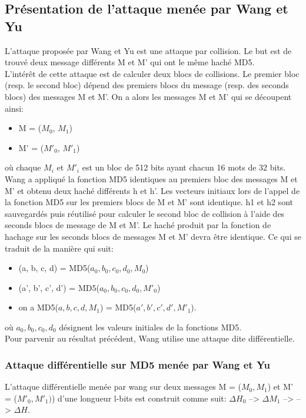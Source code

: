 \subsection{Présentation de l'attaque menée par Wang et Yu}
L'attaque proposée par Wang et Yu est une attaque par collision. Le but est de trouvé deux message différents M et M' qui ont le même haché MD5.\\

L'intérêt de cette attaque est de calculer deux blocs de collisions. Le premier bloc (resp. le second bloc) dépend des premiers blocs du message (resp. des seconds blocs) des messages M et M'. On a alors les messages M et M' qui se découpent ainsi:
\begin{itemize}
  \item M = ($M_{0}$, $M_{1}$)
  \item M' = ($M'_{0}$, $M'_{1}$)
\end{itemize}
où chaque $M_{i}$ et $M'_{i}$ est un bloc de 512 bits ayant chacun 16 mots de 32 bits.\\

Wang a appliqué la fonction MD5 identiques au premiers bloc des messages M et M' et obtenu deux haché différents h et h'. Les vecteurs initiaux lors de l'appel de la fonction MD5  sur les premiers blocs de M et M' sont identique. h1 et h2 sont sauvegardés puis réutilisé pour calculer le second bloc de collision à l'aide des seconds blocs de message de M et M'. Le haché produit par la fonction de hachage sur les seconds blocs de messages M et M' devra être identique. Ce qui se traduit de la manière qui suit:\\

\begin{itemize}
\item (a, b, c, d) = MD5($a_0, b_0, c_0, d_0, M_0$)
\item (a', b', c', d') = MD5($a_0, b_0, c_0, d_0, M'_0$)
\item on a MD5($a, b, c, d, M_1$) = MD5($a', b', c', d', M'_1$).
\end{itemize}

où $a_0, b_0, c_0, d_0$ désignent les valeurs initiales de la fonctions MD5.\\

Pour parvenir au résultat précédent, Wang utilise une attaque dite différentielle.


\subsubsection{Attaque différentielle sur MD5 menée par Wang et Yu}
L'attaque différentielle menée par wang sur deux messages M = ($M_0, M_1$) et M' = ($M'_0, M'_1)$) d'une longueur l-bits est construit comme suit: 
$\Delta$$H_0$ --> $\Delta$$M_1$ --> --> $\Delta$$H$.\\

